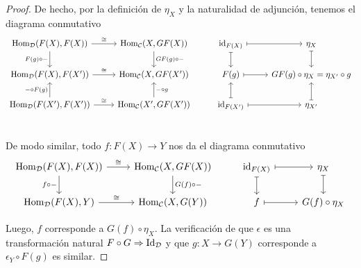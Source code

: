 \documentclass{article}
\numberwithin{equation}{section}
\theoremstyle{definition}
\begin{document}
\begin{proposicion}
\begin{proof}
    De hecho, por la definición de $\eta_X$ y la naturalidad de adjunción,
    tenemos el diagrama conmutativo
    \[ \begin{tikzcd}
        \Hom_\vcateg{D} (F (X), F (X))\ar{r}{\isom}\ar{d}[swap]{F (g)\circ -} & \Hom_\vcateg{C} (X, GF (X))\ar{d}{GF (g)\circ -} & \id{F(X)}\ar[|->]{d}\ar[|->]{r} & \eta_X\ar[|->]{d} \\
        \Hom_\vcateg{D} (F (X), F (X'))\ar{r}{\isom} & \Hom_\vcateg{C} (X, GF (X')) & F (g) \ar[|->]{r} & GF (g) \circ \eta_X = \eta_{X'}\circ g \\
        \Hom_\vcateg{D} (F (X'), F (X'))\ar{r}{\isom}\ar{u}{-\circ F (g)} & \Hom_\vcateg{C} (X', GF (X'))\ar{u}[swap]{-\circ g} & \id{F(X')}\ar[|->]{r}\ar[|->]{u} & \eta_{X'} \ar[|->]{u} \\
      \end{tikzcd} \]

    De modo similar, todo $f\colon F (X)\to Y$ nos da el diagrama conmutativo
    \[ \begin{tikzcd}
        \Hom_\vcateg{D} (F (X), F (X))\ar{r}{\isom}\ar{d}[swap]{f\circ -} & \Hom_\vcateg{C} (X, GF (X))\ar{d}{G (f)\circ -} & \id{F(X)}\ar[|->]{d}\ar[|->]{r} & \eta_X\ar[|->]{d} \\
        \Hom_\vcateg{D} (F (X), Y)\ar{r}{\isom} & \Hom_\vcateg{C} (X, G (Y)) & f \ar[|->]{r} & G (f) \circ \eta_X
      \end{tikzcd} \]

    Luego, $f$ corresponde a $G (f) \circ \eta_X$. La verificación de que
    $\epsilon$ es una transformación natural
    $F\circ G\Rightarrow \operatorname{Id}_\mathcal{D}$ y que $g\colon X \to G (Y)$ corresponde
    a $\epsilon_Y\circ F (g)$ es similar.
  \end{proof}
\end{proposicion}

\end{document}

